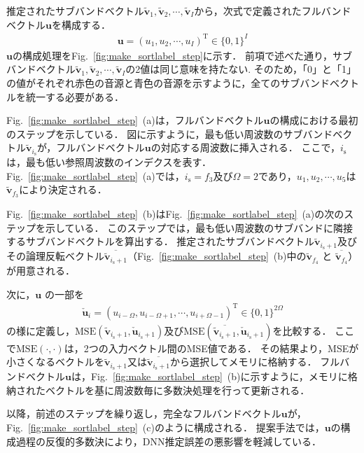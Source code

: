 推定されたサブバンドベクトル$\tilde{\bm{v}}_1, \tilde{\bm{v}}_2, \cdots, \tilde{\bm{v}}_I$から，次式で定義されたフルバンドベクトル$\bm{u}$を構成する．
\begin{align}
    \bm{u} = (u_{1}, u_{2}, \cdots, u_{I})^\mathrm{T} \in \{0,1\}^{I}
\end{align}
$\bm{u}$の構成処理をFig.~\ref{fig:make_sortlabel_step}に示す．
前項で述べた通り，サブバンドベクトル$\tilde{\bm{v}}_1, \tilde{\bm{v}}_2, \cdots, \tilde{\bm{v}}_I$の2値は同じ意味を持たない.
そのため，「0」と「1」の値がそれぞれ赤色の音源と青色の音源を示すように，全てのサブバンドベクトルを統一する必要がある．

Fig.~\ref{fig:make_sortlabel_step}~(a)は，フルバンドベクトル$\bm{u}$の構成における最初のステップを示している．
図に示すように，最も低い周波数のサブバンドベクトル$\tilde{\bm{v}}_{i_\mathrm{s}}$が，フルバンドベクトル$\bm{u}$の対応する周波数に挿入される．
ここで，$i_\mathrm{s}$は，最も低い参照周波数のインデクスを表す．
Fig.~\ref{fig:make_sortlabel_step}~(a)では，$i_\mathrm{s} = f_3$及び$\Omega=2$であり，$u_1, u_2, \cdots, u_5$は$\tilde{\bm{v}}_{f_3}$により決定される．

Fig.~\ref{fig:make_sortlabel_step}~(b)はFig.~\ref{fig:make_sortlabel_step}~(a)の次のステップを示している．
このステップでは，最も低い周波数のサブバンドに隣接するサブバンドベクトルを算出する．
推定されたサブバンドベクトル$\tilde{\bm{v}}_{i_\mathrm{s}+1}$及びその論理反転ベクトル$\overline{\tilde{\bm{v}}_{i_\mathrm{s}+1}}$（Fig.~\ref{fig:make_sortlabel_step}~(b)中の$\tilde{\bm{v}}_{f_4}$ と $\overline{\tilde{\bm{v}}_{f_4}}$）が用意される．

次に，$\bm{u}$ の一部を
\begin{align}
    \check{\bm{u}}_{i} = (u_{i-\Omega}, u_{i-\Omega+1}, \cdots, u_{i+\Omega-1})^\mathrm{T} \in \{0,1\}^{2\Omega}
\end{align}
の様に定義し，$\mathrm{MSE}(\tilde{\bm{v}}_{i_\mathrm{s}+1}, \check{\bm{u}}_{i_\mathrm{s}+1})$及び$\mathrm{MSE}(\overline{\tilde{\bm{v}}_{i_\mathrm{s}+1}}, \check{\bm{u}}_{i_\mathrm{s}+1})$を比較する．
ここで$\mathrm{MSE}(\cdot, \cdot)$は，2つの入力ベクトル間のMSE値である．
その結果より，MSEが小さくなるベクトルを$\tilde{\bm{v}}_{i_\mathrm{s}+1}$又は$\overline{\tilde{\bm{v}}_{i_\mathrm{s}+1}}$から選択してメモリに格納する．
フルバンドベクトル$\bm{u}$は，Fig.~\ref{fig:make_sortlabel_step}~(b)に示すように，メモリに格納されたベクトルを基に周波数毎に多数決処理を行って更新される．

以降，前述のステップを繰り返し，完全なフルバンドベクトル$\bm{u}$が，Fig.~\ref{fig:make_sortlabel_step}~(c)のように構成される．
提案手法では，$\bm{u}$の構成過程の反復的多数決により，DNN推定誤差の悪影響を軽減している．

